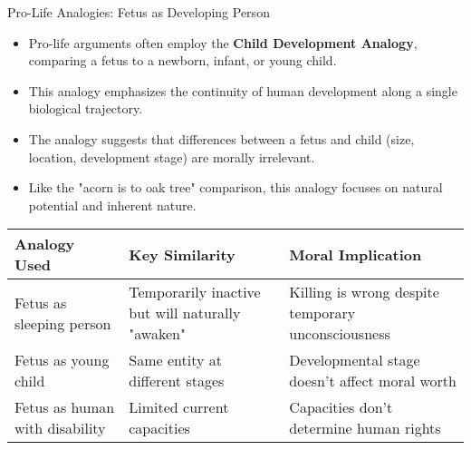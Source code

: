 \documentclass{beamer}
\begin{document}
	\begin{frame}{Pro-Life Analogies: Fetus as Developing Person}
		\begin{itemize}
			\item Pro-life arguments often employ the \textbf{Child Development Analogy}, comparing a fetus to a newborn, infant, or young child.
			\item This analogy emphasizes the continuity of human development along a single biological trajectory.
			\item The analogy suggests that differences between a fetus and child (size, location, development stage) are morally irrelevant.
			\item Like the "acorn is to oak tree" comparison, this analogy focuses on natural potential and inherent nature.
		\end{itemize}
		
		\begin{table}
			\scriptsize
			\begin{tabular}{|p{3cm}|p{4cm}|p{4cm}|}
				\hline
				\textbf{Analogy Used} & \textbf{Key Similarity} & \textbf{Moral Implication} \\
				\hline
				Fetus as sleeping person & Temporarily inactive but will naturally "awaken" & Killing is wrong despite temporary unconsciousness \\
				\hline
				Fetus as young child & Same entity at different stages & Developmental stage doesn't affect moral worth \\
				\hline
				Fetus as human with disability & Limited current capacities & Capacities don't determine human rights \\
				\hline
			\end{tabular}
		\end{table}
	\end{frame}
	
\end{document}
